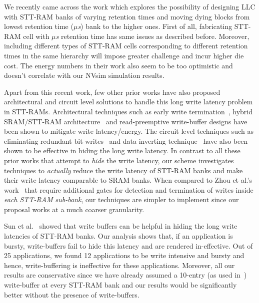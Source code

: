 We recently came across the work which explores the possibility of designing LLC with STT-RAM banks of varying
retention times and moving dying blocks from lowest retention time ({\it $\mu$s}) bank to the higher ones. First of all, fabricating STT-RAM cell with {\it $\mu$s} retention time has same issues as described before. Moreover, including different types of STT-RAM cells corresponding to different retention times in the same hierarchy will impose greater challenge and incur higher die cost. The energy numbers in their work also seem to be too optimistic and doesn't correlate with our NVsim simulation results.

Apart from this recent work, few other prior works have also proposed architectural and circuit level
solutions to handle this long write latency problem in STT-RAMs. Architectural techniques such as
early write termination~\cite{mram-energy-reduction}, hybrid SRAM/STT-RAM
architecture~\cite{gsun-hpca, Qureshi:2009:SHPMM} and read-preemptive write-buffer designs have been
shown to mitigate write latency/energy. The circuit level techniques such as eliminating redundant
bit-writes~\cite{mram-energy-reduction} and data inverting technique~\cite{gsun-hpca} have also been
shown to be effective in hiding the long write latency. In contrast to all these prior works that
attempt to {\it hide} the write latency, our scheme investigates techniques to {\it actually} reduce
the write latency of STT-RAM banks and make their write latency comparable to SRAM banks. When
compared to Zhou et al.'s work~\cite{mram-energy-reduction} that require additional gates for
detection and termination of writes inside {\it each STT-RAM sub-bank}, our techniques are simpler to
implement since our proposal works at a much coarser granularity.

Sun et al.~\cite{gsun-hpca} showed that write buffers can be helpful in hiding the long write
latencies of STT-RAM banks. Our analysis shows that, if an application is bursty, write-buffers fail
to hide this latency and are rendered in-effective. Out of 25 applications, we found 12 applications
to be write intensive and bursty and hence, write-buffering is ineffective for these applications.
Moreover, all our results are conservative since we have already assumed a 10-entry (as used
in~\cite{gsun-hpca}) write-buffer at every STT-RAM bank and our results would be significantly better
without the presence of write-buffers.

